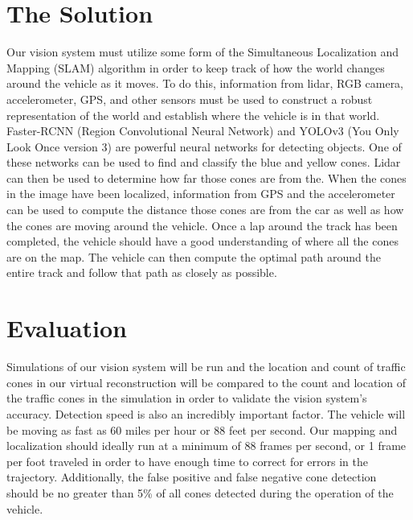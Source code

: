 \documentclass[10pt]{article}
\begin{document}
\section{The Solution}
Our vision system must utilize some form of the Simultaneous Localization and Mapping (SLAM) algorithm in order to keep track of how the world changes around the vehicle as it moves. To do this, information from lidar, RGB camera, accelerometer, GPS, and other sensors must be used to construct a robust representation of the world and establish where the vehicle is in that world. Faster-RCNN (Region Convolutional Neural Network) and YOLOv3 (You Only Look Once version 3) are powerful neural networks for detecting objects. One of these networks can be used to find and classify the blue and yellow cones. Lidar can then be used to determine how far those cones are from the. When the cones in the image have been localized, information from GPS and the accelerometer can be used to compute the distance those cones are from the car as well as how the cones are moving around the vehicle. Once a lap around the track has been completed, the vehicle should have a good understanding of where all the cones are on the map. The vehicle can then compute the optimal path around the entire track and follow that path as closely as possible.

\section{Evaluation}
Simulations of our vision system will be run and the location and count of traffic cones in our virtual reconstruction will be compared to the count and location of the traffic cones in the simulation in order to validate the vision system’s accuracy. Detection speed is also an incredibly important factor. The vehicle will be moving as fast as 60 miles per hour or 88 feet per second. Our mapping and localization should ideally run at a minimum of 88 frames per second, or 1 frame per foot traveled in order to have enough time to correct for errors in the trajectory. Additionally, the false positive and false negative cone detection should be no greater than 5\% of all cones detected during the operation of the vehicle.
\end{document}
